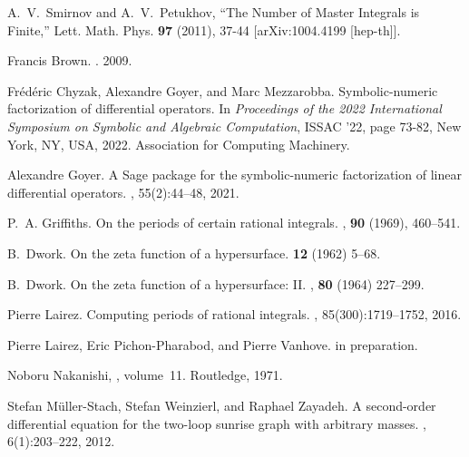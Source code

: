 \documentclass[a4paper,12pt]{article}
\numberwithin{equation}{section}
\numberwithin{figure}{section}
\begin{document}
\begin{thebibliography}{99}
A.~V.~Smirnov and A.~V.~Petukhov,
``The Number of Master Integrals is Finite,''
Lett. Math. Phys. \textbf{97} (2011), 37-44
[arXiv:1004.4199 [hep-th]].



Francis Brown.
.
 2009.
\newblock [arXiv:0910.0114]  

Fr\'{e}d\'{e}ric Chyzak, Alexandre Goyer, and Marc Mezzarobba.
\newblock Symbolic-numeric factorization of differential operators.
\newblock In {\em Proceedings of the 2022 International Symposium on Symbolic
  and Algebraic Computation}, ISSAC '22, page 73-82, New York, NY, USA, 2022.
Association for Computing Machinery.
\newblock [arXiv:2205.08991]

Alexandre Goyer.
\newblock A {S}age package for the symbolic-numeric factorization of linear
  differential operators.
, 55(2):44--48,
2021.


P.~A. Griffiths.
\newblock On the periods of certain rational integrals.
, {\bf 90} (1969), 460--541.

B.~Dwork.
\newblock On the zeta function of a hypersurface.
 {\bf 12} (1962) 5--68.

B.~Dwork.
\newblock On the zeta function of a hypersurface: {{II}}.
, {\bf 80} (1964) 227--299.

Pierre Lairez.
\newblock Computing periods of rational integrals.
, 85(300):1719--1752, 2016.
\newblock [arXiv:1404.5069]

Pierre Lairez, Eric Pichon-Pharabod, and Pierre Vanhove.
\newblock in preparation.



Noboru Nakanishi,
, volume~11.
\newblock Routledge, 1971.


Stefan M{\"u}ller-Stach, Stefan Weinzierl, and Raphael Zayadeh.
\newblock A second-order differential equation for the two-loop sunrise graph
  with arbitrary masses.
, 6(1):203--222,
2012.
\newblock [arXiv:1112.4360]


\end{thebibliography}
\end{document}
